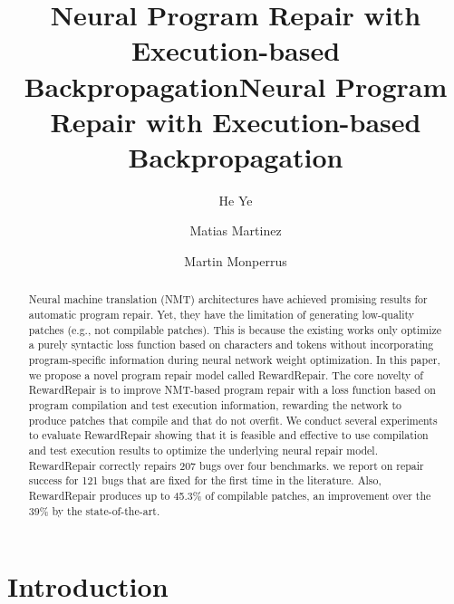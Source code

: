 \title{Neural Program Repair with Execution-based Backpropagation}



\title{Neural Program Repair with Execution-based Backpropagation}

\author{He Ye}

\author{Matias Martinez}

\author{Martin Monperrus}

\begin{abstract}

Neural machine translation (NMT) architectures  have achieved promising results  for  automatic program repair.
Yet, they  have the limitation of generating
low-quality  patches (e.g., not compilable patches). 
This is because the existing works only optimize a purely syntactic loss function based on characters and tokens without incorporating program-specific information during neural network weight optimization. 
In this paper, we propose a novel program repair model called RewardRepair. 
The core novelty of RewardRepair is to improve NMT-based program repair with a loss function based on program compilation and test execution information, rewarding the network to produce patches that compile and that do not overfit.
We conduct several experiments to evaluate RewardRepair showing that it is feasible and effective to use compilation and test execution results to optimize the underlying neural repair model. RewardRepair correctly repairs 207 bugs over four benchmarks. 
we report on repair success for 121 bugs that are fixed for the first time in the literature.
Also, RewardRepair produces up to 45.3\% of compilable patches, an improvement over the 39\%  by the state-of-the-art.
\end{abstract}

\maketitle

\section{Introduction}

